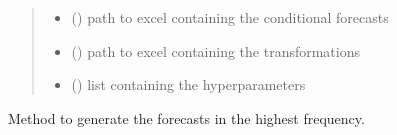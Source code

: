 \documentclass[letterpaper,10pt,english]{sphinxmanual}
\begin{document}
\begin{fulllineitems}
\begin{fulllineitems}
\begin{quote}
\begin{description}
\begin{itemize}
\item {} 
\sphinxAtStartPar
{} () \textendash{} path to excel containing the conditional forecasts

\item {} 
\sphinxAtStartPar
{} () \textendash{} path to excel containing the transformations

\item {} 
\sphinxAtStartPar
{} () \textendash{} list containing the hyperparameters

\end{itemize}

\end{description}\end{quote}

\end{fulllineitems}


\begin{fulllineitems}
\label{\detokenize{MUFBVAR:MUFBVAR.mufbvar.multifrequency_var.forecast}}
\pysigstartsignatures
{}
\pysigstopsignatures
\sphinxAtStartPar
Method to generate the forecasts in the highest frequency.

\end{fulllineitems}



\end{fulllineitems}
\end{document}
